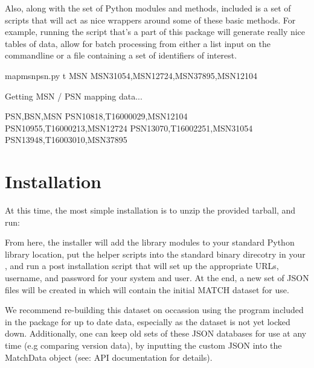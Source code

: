 \documentclass[letterpaper,10pt,english]{sphinxmanual}
\begin{document}
Also, along with the set of Python modules and methods, included is a set of
 scripts that will act as nice wrappers around some of these basic
methods.  For example, running the  script that’s a part of this
package will generate really nice tables of data, allow for batch processing from
either a list input on the commandline or a file containing a set of identifiers
of interest.

%
\begin{sphinxVerbatim}[commandchars=\\\{\}]
\PYGZdl{} map\PYGZus{}msn\PYGZus{}psn.py \PYGZhy{}t MSN MSN31054,MSN12724,MSN37895,MSN12104

Getting MSN / PSN mapping data...

PSN,BSN,MSN
PSN10818,T\PYGZhy{}16\PYGZhy{}000029,MSN12104
PSN10955,T\PYGZhy{}16\PYGZhy{}000213,MSN12724
PSN13070,T\PYGZhy{}16\PYGZhy{}002251,MSN31054
PSN13948,T\PYGZhy{}16\PYGZhy{}003010,MSN37895
\end{sphinxVerbatim}


\section{Installation}
\label{\detokenize{intro:installation}}
At this time, the most simple installation is to unzip the provided tarball, and
run:

%
\begin{sphinxVerbatim}[commandchars=\\\{\}]
  
\end{sphinxVerbatim}

From here, the installer will add the library modules to your standard Python
library location, put the helper scripts into the standard binary direcotry in
your , and run a post installation script that will set up the appropriate
URLs, username, and password for your system and user.  At the end, a new set of
JSON files will be created in  which will contain the initial
MATCH dataset for use.

We recommend re-building this dataset on occassion using the
 program included in the package for up to date data,
especially as the dataset is not yet locked down. Additionally, one can keep old
sets of these JSON databases for use at any time (e.g comparing version data), by
inputting the custom JSON into the MatchData object (see: 
API documentation for details).
\end{document}
